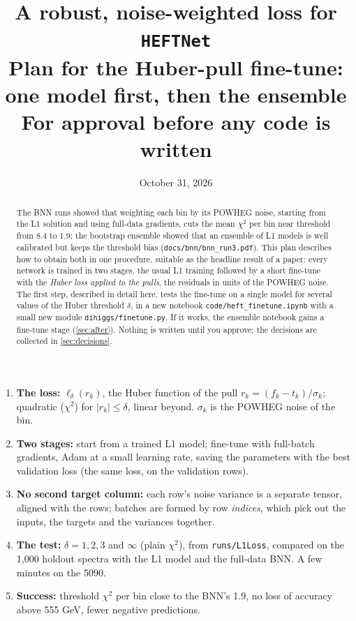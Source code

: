 \documentclass[11pt]{article}
\title{\textbf{A robust, noise-weighted loss for \texttt{HEFTNet}}\\[4pt]
\large Plan for the Huber-pull fine-tune: one model first, then the ensemble\\[4pt]
\normalsize For approval before any code is written}
\date{October 31, 2026}
\newcommand{\file}[1]{\nolinkurl{#1}}
\begin{document}
\maketitle

\begin{abstract}
\noindent
The BNN runs showed that weighting each bin by its POWHEG noise, starting from the L1
solution and using full-data gradients, cuts the mean $\chi^2$ per bin near threshold from
8.4 to 1.9; the bootstrap ensemble showed that an ensemble of L1 models is well calibrated
but keeps the threshold bias (\file{docs/bnn/bnn_run3.pdf}). This plan describes how to
obtain both in one procedure, suitable as the headline result of a paper: every network is
trained in two stages, the usual L1 training followed by a short fine-tune with the
\emph{Huber loss applied to the pulls}, the residuals in units of the POWHEG noise. The
first step, described in detail here, tests the fine-tune on a single model for several
values of the Huber threshold $\delta$, in a new notebook \file{code/heft_finetune.ipynb}
with a small new module \file{dihiggs/finetune.py}. If it works, the ensemble notebook gains
a fine-tune stage (\cref{sec:after}). Nothing is written until you approve; the decisions
are collected in \cref{sec:decisions}.
\end{abstract}

\begin{keyidea}
\begin{enumerate}
  \item \textbf{The loss:} $\ell_\delta(r_k)$, the Huber function of the pull
    $r_k = (f_k - t_k)/\sigma_k$; quadratic ($\chi^2$) for $|r_k| \le \delta$, linear
    beyond. $\sigma_k$ is the POWHEG noise of the bin.
  \item \textbf{Two stages:} start from a trained L1 model; fine-tune with full-batch
    gradients, Adam at a small learning rate, saving the parameters with the best
    validation loss (the same loss, on the validation rows).
  \item \textbf{No second target column:} each row's noise variance is a separate tensor,
    aligned with the rows; batches are formed by row \emph{indices}, which pick out the
    inputs, the targets and the variances together.
  \item \textbf{The test:} $\delta = 1, 2, 3$ and $\infty$ (plain $\chi^2$), from
    \file{runs/L1Loss}, compared on the 1,000 holdout spectra with the L1 model and the
    full-data BNN. A few minutes on the 5090.
  \item \textbf{Success:} threshold $\chi^2$ per bin close to the BNN's 1.9, no loss of
    accuracy above 555 GeV, fewer negative predictions.
\end{enumerate}
\end{keyidea}
\end{document}
